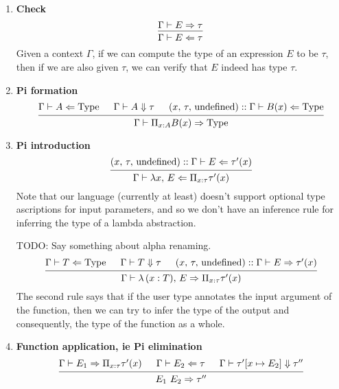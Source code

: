 \documentclass{article}
\begin{document}
\begin{definition} 
\begin{enumerate}
  \item \textbf{Check} \\
    \[
      \begin{prooftree}
        \hypo{\Gamma \vdash E \Rightarrow \tau}
        \infer1{\Gamma \vdash E \Leftarrow \tau}
      \end{prooftree}
    \]
    Given a context $\Gamma$, if we can compute the type of an expression $E$ to
    be $\tau$, then if we are also given $\tau$, we can verify that $E$
    indeed has type $\tau$.

  \item \textbf{Pi formation} \\
    \[
      \begin{prooftree}
        \hypo{\Gamma \vdash A \Leftarrow \Type}
        \hypo{\Gamma \vdash A \Downarrow \tau}
        \hypo{(x, \, \tau, \, \text{undefined}) :: \Gamma \vdash B(x) \Leftarrow \Type}
        \infer3{\Gamma \vdash \Pi_{x : A}B(x) \Rightarrow \Type}
      \end{prooftree}
    \]

  \item \textbf{Pi introduction} \\
    \[
      \begin{prooftree}
        \hypo{(x, \, \tau, \, \text{undefined}) :: \Gamma \vdash E \Leftarrow \tau'(x)}
        \infer1{\Gamma \vdash \lambda x, \, E \Leftarrow \Pi_{x : \tau}\tau'(x)}
      \end{prooftree}
    \]
    Note that our language (currently at least) doesn't support optional type
    ascriptions for input parameters, and so we don't have an inference rule
    for inferring the type of a lambda abstraction. 

    TODO: Say something about alpha renaming.
    \[
      \begin{prooftree}
        \hypo{\Gamma \vdash T \Leftarrow \Type}
        \hypo{\Gamma \vdash T \Downarrow \tau}
        \hypo{(x, \, \tau, \, \text{undefined}) :: \Gamma \vdash E \Rightarrow \tau'(x)}
        \infer3{\Gamma \vdash \lambda \, (x : T), \, E \Rightarrow \Pi_{x : \tau}\tau'(x)}
      \end{prooftree}
    \]
    The second rule says that if the user type annotates the input argument of
    the function, then we can try to infer the type of the output and
    consequently, the type of the function as a whole.

  \item \textbf{Function application, ie Pi elimination} \\
    \[
      \begin{prooftree}
        \hypo{\Gamma \vdash E_1 \Rightarrow \Pi_{x : \tau}\tau'(x)}
        \hypo{\Gamma \vdash E_2 \Leftarrow \tau}
        \hypo{\Gamma \vdash \tau'[x \mapsto E_2] \Downarrow \tau''}
        \infer3{E_1 \,\, E_2 \Rightarrow \tau''}
      \end{prooftree}
    \]


\end{enumerate}
\end{definition}
\end{document}
